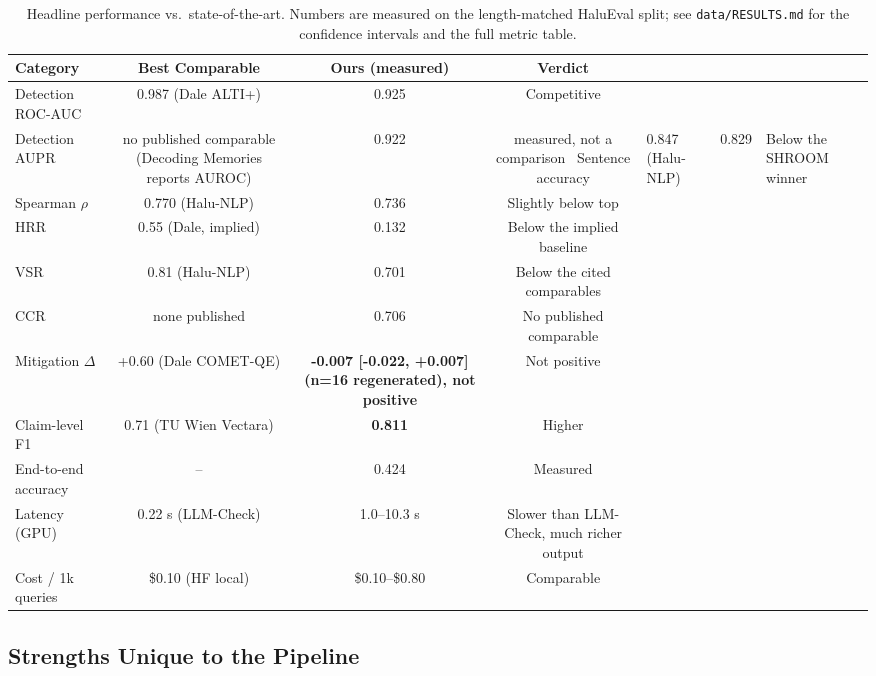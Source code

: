 \begin{table}[ht]
\centering
\small
\begin{tabular}{lccc}
\hline
\textbf{Category} & \textbf{Best Comparable} & \textbf{Ours (measured)} & \textbf{Verdict} \\
\hline
Detection ROC-AUC & 0.987 (Dale ALTI+) & 0.925 & Competitive \\
Detection AUPR & no published comparable (Decoding Memories reports AUROC) & 0.922 & measured, not a comparison \
Sentence accuracy & 0.847 (Halu-NLP) & 0.829 & Below the SHROOM winner \\
Spearman $\rho$ & 0.770 (Halu-NLP) & 0.736 & Slightly below top \\
HRR & 0.55 (Dale, implied) & 0.132 & Below the implied baseline \\
VSR & 0.81 (Halu-NLP) & 0.701 & Below the cited comparables \\
CCR & none published & 0.706 & No published comparable \\
Mitigation $\Delta$ & +0.60 (Dale COMET-QE) & \textbf{-0.007 [-0.022, +0.007] (n=16 regenerated), not positive} & Not positive \\
Claim-level F1 & 0.71 (TU Wien Vectara) & \textbf{0.811} & Higher \\
End-to-end accuracy & -- & 0.424 & Measured \\
Latency (GPU) & 0.22 s (LLM-Check) & 1.0--10.3 s & Slower than LLM-Check, much richer output \\
Cost / 1k queries & \$0.10 (HF local) & \$0.10--\$0.80 & Comparable \\
\hline
\end{tabular}
\caption{Headline performance vs.\ state-of-the-art. Numbers are measured
on the length-matched HaluEval split; see \texttt{data/RESULTS.md} for the
confidence intervals and the full metric table.}
\label{tab:headline}
\end{table}

\subsection{Strengths Unique to the Pipeline}
\label{sec:strengths}

